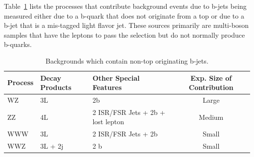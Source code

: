 		Table~\ref{tab:bjet_bkg} lists the processes that contribute background events due to b-jets being measured either due to a b-quark that does not originate from a top or due to a b-jet that is a mis-tagged light flavor jet. These sources primarily are multi-boson samples that have the leptons to pass the selection but do not normally produce b-quarks.

	\begin{table}[hbt]
	\begin{center}
	\begin{tabular}{l|ll|c}\hline\hline %
	Process & Decay Products & Other Special Features & Exp. Size of Contribution\\
	\hline
	WZ & 3L & 2b  & Large\\
	ZZ & 4L & 2 ISR/FSR Jets + 2b + lost lepton & Medium\\
	WWW & 3L & 2 ISR/FSR Jets + 2b& Small\\
	WWZ & 3L + 2j & 2 b & Small\\
	\hline \hline
	\end{tabular}
	\caption{\label{tab:bjet_bkg} Backgrounds which contain non-top originating b-jets.}
	\end{center}
	\end{table}



		

			  
		
			
			
			
			
			